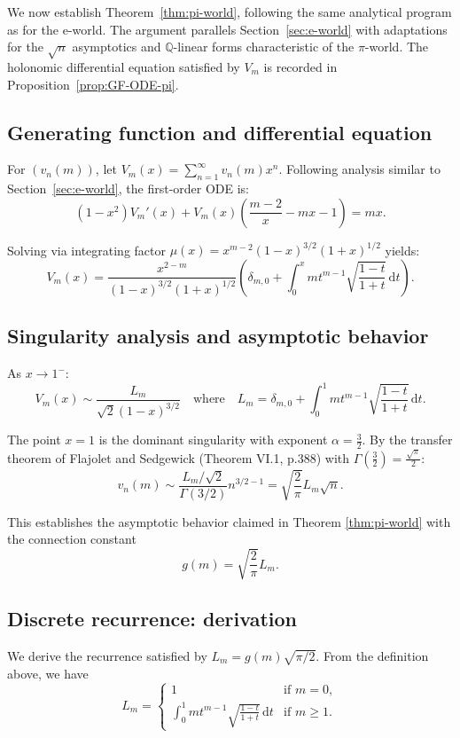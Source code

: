 \documentclass[11pt,reqno]{amsart}
\theoremstyle{definition}
\newcommand{\Q}{\mathbb{Q}}
\newcommand{\dd}{\mathrm{d}}
\newcommand{\ee}{\mathrm{e}}
\numberwithin{equation}{section}
\begin{document}
We now establish Theorem~\ref{thm:pi-world}, following the same analytical program as for the $\ee$-world. The argument parallels Section~\ref{sec:e-world} with adaptations for the $\sqrt{n}$ asymptotics and $\Q$-linear forms characteristic of the $\pi$-world. The holonomic differential equation satisfied by $V_m$ is recorded in Proposition~\ref{prop:GF-ODE-pi}.

\subsection{Generating function and differential equation}

For $(v_n(m))$, let $V_m(x) = \sum_{n=1}^\infty v_n(m)x^n$. Following analysis similar to Section~\ref{sec:e-world}, the first-order ODE is:
\[
(1-x^2)V_m'(x) + V_m(x)\left(\frac{m-2}{x}-mx-1\right) = mx.
\]

Solving via integrating factor $\mu(x) = x^{m-2}(1-x)^{3/2}(1+x)^{1/2}$ yields:
\[
V_m(x) = \frac{x^{2-m}}{(1-x)^{3/2}(1+x)^{1/2}}\left(\delta_{m,0} + \int_0^x mt^{m-1}\sqrt{\frac{1-t}{1+t}}\, \dd t\right).
\]

\subsection{Singularity analysis and asymptotic behavior}

As $x\to 1^-$: 
$$V_m(x) \sim \frac{L_m}{\sqrt{2}(1-x)^{3/2}} \quad\text{where}\quad L_m = \delta_{m,0} + \int_0^1 mt^{m-1}\sqrt{\frac{1-t}{1+t}}\, \dd t.$$

The point $x=1$ is the dominant singularity with exponent $\alpha = \frac{3}{2}$. By the transfer theorem of Flajolet and Sedgewick \cite{FlajoletSedgewick2009} (Theorem VI.1, p.388) with $\Gamma\left(\frac{3}{2}\right) = \frac{\sqrt{\pi}}{2}$:
$$v_n(m) \sim \frac{L_m/\sqrt{2}}{\Gamma(3/2)} n^{3/2-1} = \sqrt{\frac{2}{\pi}}L_m \sqrt{n}.$$

This establishes the asymptotic behavior claimed in Theorem \ref{thm:pi-world} with the connection constant
\begin{equation}\label{eq:g-def}
g(m) = \sqrt{\frac{2}{\pi}}L_m.
\end{equation}

\subsection{Discrete recurrence: derivation}

We derive the recurrence satisfied by $L_m = g(m)\sqrt{\pi/2}$. From the definition above, we have
\begin{equation}\label{eq:L-def}
L_m = \begin{cases}
1 & \text{if } m=0,\\
\displaystyle\int_0^1 mt^{m-1}\sqrt{\frac{1-t}{1+t}}\,\dd t & \text{if } m \geq 1.
\end{cases}
\end{equation}
\end{document}
